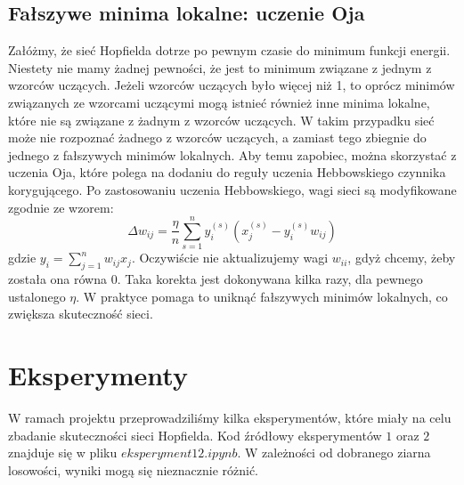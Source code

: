 \documentclass{article}
\begin{document}
\subsection{Fałszywe minima lokalne: uczenie Oja}
Załóżmy, że sieć Hopfielda dotrze po pewnym czasie do minimum funkcji energii.
Niestety nie mamy żadnej pewności, że jest to minimum związane z jednym z wzorców uczących.
Jeżeli wzorców uczących było więcej niż 1, to oprócz minimów związanych ze wzorcami uczącymi 
mogą istnieć również inne minima lokalne, które nie są związane z żadnym z wzorców uczących.
W takim przypadku sieć może nie rozpoznać żadnego z wzorców uczących, a zamiast tego zbiegnie do jednego z fałszywych minimów lokalnych.
Aby temu zapobiec, można skorzystać z uczenia Oja, które polega na dodaniu do reguły uczenia Hebbowskiego czynnika korygującego.
Po zastosowaniu uczenia Hebbowskiego, wagi sieci są modyfikowane zgodnie ze wzorem:
$$\Delta w_{ij} = \frac{\eta}{n} \sum_{s=1}^{n}y_i^{(s)}(x_j^{(s)} - y_i^{(s)}w_{ij})$$
gdzie $y_i = \sum_{j = 1}^{n} w_{ij}x_j$. Oczywiście nie aktualizujemy wagi $w_{ii}$,
gdyż chcemy, żeby została ona równa $0$.
Taka korekta jest dokonywana kilka razy, dla pewnego ustalonego $\eta$.
W praktyce pomaga to uniknąć fałszywych minimów lokalnych, co zwiększa skuteczność sieci.

\section{Eksperymenty}
W ramach projektu przeprowadziliśmy kilka eksperymentów, które miały na celu zbadanie skuteczności sieci Hopfielda.
Kod źródłowy eksperymentów $1$ oraz $2$ znajduje się w pliku $eksperyment12.ipynb$.
W zależności od dobranego ziarna losowości, wyniki mogą się nieznacznie różnić.
\end{document}
